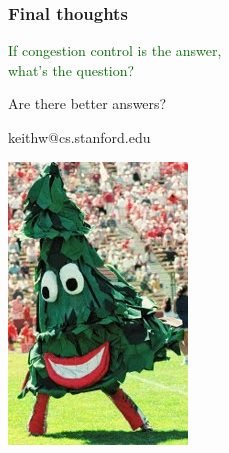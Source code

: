 \documentclass[svgnames]{beamer}
\begin{document}
\begin{frame}

\frametitle{Final thoughts}

\begin{centering}

\LARGE \textcolor{DarkGreen}{If congestion control is the answer,\\what's the question?}

\vspace{\baselineskip}

\LARGE \textcolor{NavyBlue}{Are there better answers?}

\end{centering}

\vspace{\baselineskip}
\vspace{\baselineskip}

\begin{centering}

\vspace{7 pt}

keithw@cs.stanford.edu

\end{centering}

\noindent

\begin{centering}

\includegraphics[width=1.75 cm]{stanford-tree.jpg}

\end{centering}

\end{frame}
\end{document}
